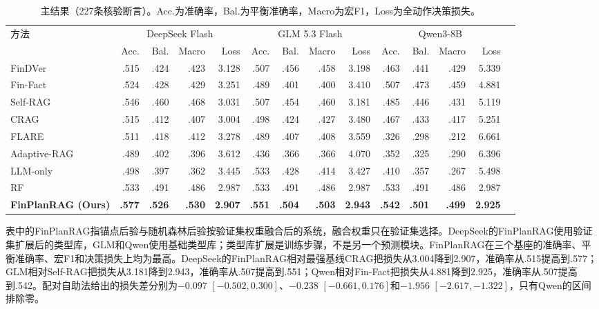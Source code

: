 \begin{table}[htbp]
\centering
{}
\setlength{\tabcolsep}{2.2pt}
\caption{主结果（227条核验断言）。Acc.为准确率，Bal.为平衡准确率，Macro为宏F1，Loss为全动作决策损失。}
\label{tab:main}
\begin{tabular}{lrrrrrrrrrrrrr}
\toprule
\multirow{2}{*}{方法} & \multicolumn{4}{c}{DeepSeek Flash} & \multicolumn{4}{c}{GLM 5.3 Flash} & \multicolumn{4}{c}{Qwen3-8B} \\
\cmidrule(lr){2-5}\cmidrule(lr){6-9}\cmidrule(lr){10-13}
 & Acc. & Bal. & Macro & Loss & Acc. & Bal. & Macro & Loss & Acc. & Bal. & Macro & Loss \\
\midrule
FinDVer & .515 & .424 & .423 & 3.128 & .507 & .456 & .458 & 3.198 & .463 & .441 & .429 & 5.339 \\
Fin-Fact & .524 & .428 & .429 & 3.251 & .489 & .401 & .400 & 3.410 & .507 & .473 & .459 & 4.881 \\
Self-RAG & .546 & .460 & .468 & 3.031 & .507 & .454 & .460 & 3.181 & .485 & .446 & .431 & 5.119 \\
CRAG & .515 & .412 & .407 & 3.004 & .498 & .424 & .427 & 3.480 & .467 & .433 & .417 & 5.251 \\
FLARE & .511 & .418 & .412 & 3.278 & .489 & .407 & .408 & 3.559 & .326 & .298 & .212 & 6.661 \\
Adaptive-RAG & .489 & .402 & .396 & 3.612 & .436 & .366 & .366 & 4.070 & .352 & .325 & .290 & 6.396 \\
\midrule
LLM-only & .498 & .397 & .362 & 3.445 & .533 & .428 & .414 & 3.427 & .410 & .357 & .267 & 5.498 \\
RF & .533 & .491 & .486 & 2.987 & .533 & .491 & .486 & 2.987 & .533 & .491 & .486 & 2.987 \\
\textbf{FinPlanRAG (Ours)} & \textbf{.577} & \textbf{.526} & \textbf{.530} & \textbf{2.907} & \textbf{.551} & \textbf{.504} & \textbf{.503} & \textbf{2.943} & \textbf{.542} & \textbf{.501} & \textbf{.499} & \textbf{2.925} \\
\bottomrule
\end{tabular}
\end{table}

表中的FinPlanRAG指锚点后验与随机森林后验按验证集权重融合后的系统，融合权重只在验证集选择。DeepSeek的FinPlanRAG使用验证集扩展后的类型库，GLM和Qwen使用基础类型库；类型库扩展是训练步骤，不是另一个预测模块。FinPlanRAG在三个基座的准确率、平衡准确率、宏F1和决策损失上均为最高。DeepSeek的FinPlanRAG相对最强基线CRAG把损失从3.004降到2.907，准确率从.515提高到.577；GLM相对Self-RAG把损失从3.181降到2.943，准确率从.507提高到.551；Qwen相对Fin-Fact把损失从4.881降到2.925，准确率从.507提高到.542。配对自助法给出的损失差分别为$-0.097$ $[-0.502,0.300]$、$-0.238$ $[-0.661,0.176]$和$-1.956$ $[-2.617,-1.322]$，只有Qwen的区间排除零。


